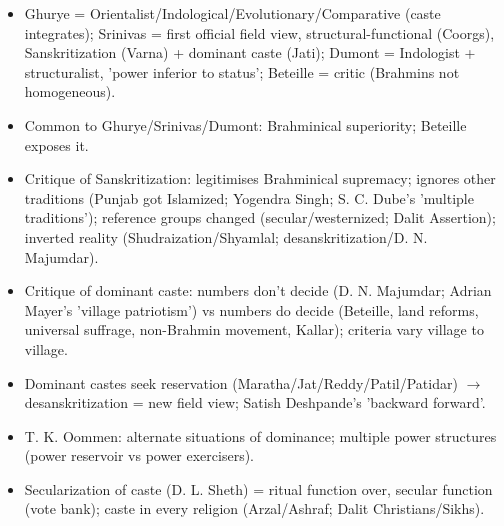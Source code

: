 \begin{QuickRevision}
\begin{itemize}
\item Ghurye = Orientalist/Indological/Evolutionary/Comparative (caste integrates); Srinivas = first official field view, structural-functional (Coorgs), Sanskritization (Varna) + dominant caste (Jati); Dumont = Indologist + structuralist, 'power inferior to status'; Beteille = critic (Brahmins not homogeneous).
\item Common to Ghurye/Srinivas/Dumont: Brahminical superiority; Beteille exposes it.
\item Critique of Sanskritization: legitimises Brahminical supremacy; ignores other traditions (Punjab got Islamized; Yogendra Singh; S. C. Dube's 'multiple traditions'); reference groups changed (secular/westernized; Dalit Assertion); inverted reality (Shudraization/Shyamlal; desanskritization/D. N. Majumdar).
\item Critique of dominant caste: numbers don't decide (D. N. Majumdar; Adrian Mayer's 'village patriotism') vs numbers do decide (Beteille, land reforms, universal suffrage, non-Brahmin movement, Kallar); criteria vary village to village.
\item Dominant castes seek reservation (Maratha/Jat/Reddy/Patil/Patidar) $\rightarrow$ desanskritization = new field view; Satish Deshpande's 'backward forward'.
\item T. K. Oommen: alternate situations of dominance; multiple power structures (power reservoir vs power exercisers).
\item Secularization of caste (D. L. Sheth) = ritual function over, secular function (vote bank); caste in every religion (Arzal/Ashraf; Dalit Christians/Sikhs).
\end{itemize}
\end{QuickRevision}

